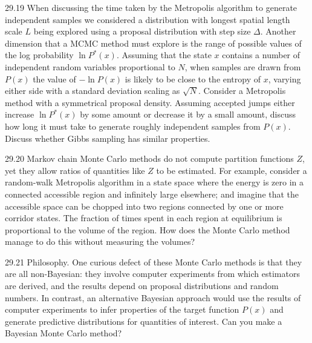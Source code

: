 \documentclass[12pt, a4paper]{article}
\begin{document}
\begin{prob}{29.19}
When discussing the time taken by the Metropolis algorithm to generate independent samples we considered a distribution with longest spatial length scale $L$ being explored using a proposal distribution with step size $\Delta$. Another dimension that a MCMC method must explore is the range of possible values of the log probability $\ln P^\ast(x)$. Assuming that the state $x$ contains a number of independent random variables proportional to $N$, when samples are drawn from $P(x)$ the value of $-\ln P(x)$ is likely to be close to the entropy of $x$, varying either side with a standard deviation scaling as $\sqrt{N}$. Consider a Metropolis method with a symmetrical proposal density. Assuming accepted jumps either increase $\ln P^\ast(x)$ by some amount or decrease it by a small amount, discuss how long it must take to generate roughly independent samples from $P(x)$. Discuss whether Gibbs sampling has similar properties.
\end{prob}
\begin{sol}
\end{sol}
\bigskip

\begin{prob}{29.20}
Markov chain Monte Carlo methods do not compute partition functions $Z$, yet they allow ratios of quantities like $Z$ to be estimated. For example, consider a random-walk Metropolis algorithm in a state space where the energy is zero in a connected accessible region and infinitely large elsewhere; and imagine that the accessible space can be chopped into two regions connected by one or more corridor states. The fraction of times spent in each region at equilibrium is proportional to the volume of the region. How does the Monte Carlo method manage to do this without measuring the volumes?
\end{prob}
\begin{sol}
\end{sol}
\bigskip

\begin{prob}{29.21}
Philosophy. One curious defect of these Monte Carlo methods is that they are all non-Bayesian: they involve computer experiments from which estimators are derived, and the results depend on proposal distributions and random numbers. In contrast, an alternative Bayesian approach would use the results of computer experiments to infer properties of the target function $P(x)$ and generate predictive distributions for quantities of interest. Can you make a Bayesian Monte Carlo method?
\end{prob}
\begin{sol}
\end{sol}
\bigskip
\end{document}
